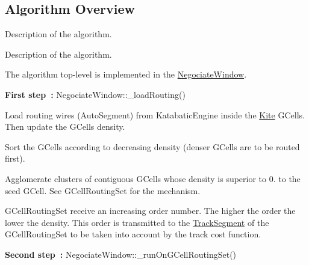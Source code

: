 \hypertarget{group__AlgorithmOverview}{}\subsection{Algorithm Overview}
\label{group__AlgorithmOverview}


Description of the algorithm.  


Description of the algorithm. 

The algorithm top-\/level is implemented in the {\ttfamily \hyperlink{classKite_1_1NegociateWindow}{Negociate\+Window}}.

{\bfseries First step~\+:} Negociate\+Window\+::\+\_\+load\+Routing() 
\begin{DoxyEnumerate}
\item Load routing wires ({\ttfamily Auto\+Segment}) from {\ttfamily Katabatic\+Engine} inside the \hyperlink{namespaceKite}{Kite} {\ttfamily G\+Cell\textquotesingle{}s}. Then update the {\ttfamily G\+Cell\textquotesingle{}s} density. 
\item Sort the {\ttfamily G\+Cell\textquotesingle{}s} according to decreasing density (denser {\ttfamily G\+Cell\textquotesingle{}s} are to be routed first). 
\item Agglomerate clusters of contiguous G\+Cell\textquotesingle{}s whose density is superior to 0. to the seed G\+Cell. See {\ttfamily G\+Cell\+Routing\+Set} for the mechanism.

G\+Cell\+Routing\+Set receive an increasing order number. The higher the order the lower the density. This order is transmitted to the {\ttfamily \hyperlink{classKite_1_1TrackSegment}{Track\+Segment}} of the {\ttfamily G\+Cell\+Routing\+Set} to be taken into account by the track cost function. 
\end{DoxyEnumerate}

{\bfseries Second step~\+:} {\ttfamily Negociate\+Window\+::\+\_\+run\+On\+G\+Cell\+Routing\+Set()} 

